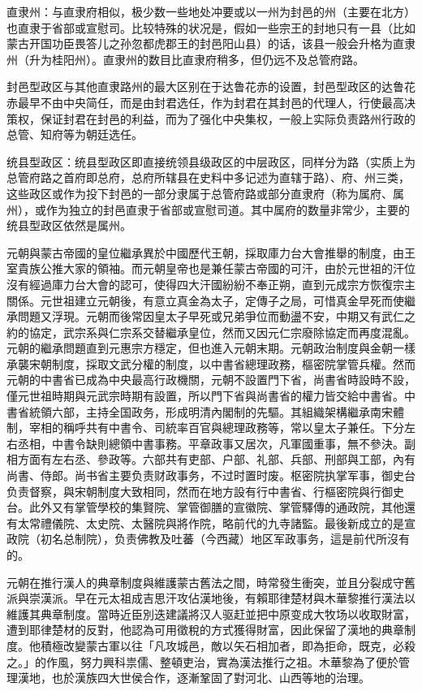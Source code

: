 直隶州：与直隶府相似，极少数一些地处冲要或以一州为封邑的州（主要在北方）也直隶于省部或宣慰司。比较特殊的状况是，假如一些宗王的封地只有一县（比如蒙古开国功臣畏答儿之孙忽都虎郡王的封邑阳山县）的话，该县一般会升格为直隶州（升为桂阳州）。直隶州的数目比直隶府稍多，但仍远不及总管府路。

封邑型政区与其他直隶路州的最大区别在于达鲁花赤的设置，封邑型政区的达鲁花赤最早不由中央简任，而是由封君选任，作为封君在其封邑的代理人，行使最高决策权，保证封君在封邑的利益，而为了强化中央集权，一般上实际负责路州行政的总管、知府等为朝廷选任。

统县型政区：统县型政区即直接统领县级政区的中层政区，同样分为路（实质上为总管府路之首府即总府，总府所辖县在史料中多记述为直辖于路）、府、州三类，这些政区或作为投下封邑的一部分隶属于总管府路或部分直隶府（称为属府、属州），或作为独立的封邑直隶于省部或宣慰司道。其中属府的数量非常少，主要的统县型政区依然是属州。

元朝與蒙古帝國的皇位繼承異於中國歷代王朝，採取庫力台大會推舉的制度，由王室貴族公推大家的領袖。而元朝皇帝也是兼任蒙古帝國的可汗，由於元世祖的汗位沒有經過庫力台大會的認可，使得四大汗國紛紛不奉正朔，直到元成宗方恢復宗主關係。元世祖建立元朝後，有意立真金為太子，定傳子之局，可惜真金早死而使繼承問題又浮現。元朝而後常因皇太子早死或兄弟爭位而動盪不安，中期又有武仁之約的協定，武宗系與仁宗系交替繼承皇位，然而又因元仁宗廢除協定而再度混亂。元朝的繼承問題直到元惠宗方穩定，但也進入元朝末期。元朝政治制度與金朝一樣承襲宋朝制度，採取文武分權的制度，以中書省總理政務，樞密院掌管兵權。然而元朝的中書省已成為中央最高行政機關，元朝不設置門下省，尚書省時設時不設，僅元世祖時期與元武宗時期有設置，所以門下省與尚書省的權力皆交給中書省。中書省統領六部，主持全国政务，形成明清內閣制的先驅。其組織架構繼承南宋體制，宰相的稱呼共有中書令、司統率百官與總理政務等，常以皇太子兼任。下分左右丞相，中書令缺則總領中書事務。平章政事又居次，凡軍國重事，無不參決。副相方面有左右丞、參政等。六部共有吏部、户部、礼部、兵部、刑部與工部，內有尚書、侍郎。尚书省主要负责财政事务，不过时置时废。枢密院执掌军事，御史台负责督察，與宋朝制度大致相同，然而在地方設有行中書省、行樞密院與行御史台。此外又有掌管學校的集賢院、掌管御膳的宣徽院、掌管驛傳的通政院，其他還有太常禮儀院、太史院、太醫院與將作院，略前代的九寺諸監。最後新成立的是宣政院（初名总制院），负责佛教及吐蕃（今西藏）地区军政事务，這是前代所沒有的。

元朝在推行漢人的典章制度與維護蒙古舊法之間，時常發生衝突，並且分裂成守舊派與崇漢派。早在元太祖成吉思汗攻佔漢地後，有賴耶律楚材與木華黎推行漢法以維護其典章制度。當時近臣別迭建議將汉人驱赶並把中原变成大牧场以收取財富，遭到耶律楚材的反對，他認為可用徵稅的方式獲得財富，因此保留了漢地的典章制度。他積極改變蒙古軍以往「凡攻城邑，敵以矢石相加者，即為拒命，既克，必殺之。」的作風，努力興科祟儒、整頓吏治，實為漢法推行之祖。木華黎為了便於管理漢地，也於漢族四大世侯合作，逐漸鞏固了對河北、山西等地的治理。

